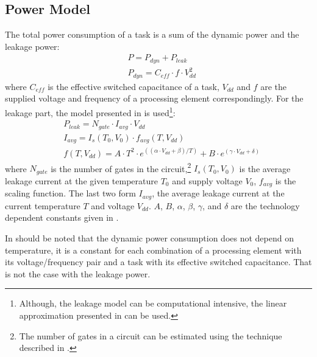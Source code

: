 \subsection{Power Model}
The total power consumption of a task is a sum of the dynamic power and the leakage power:
\begin{align*}
  & P = P_{dyn} + P_{leak} \\
  & P_{dyn} = C_{eff} \cdot f \cdot V_{dd}^2
\end{align*}
where $C_{eff}$ is the effective switched capacitance of a task, $V_{dd}$ and $f$ are the supplied voltage and frequency of a processing element correspondingly. For the leakage part, the model presented in \cite{liao2005} is used\footnote{Although, the leakage model can be computational intensive, the linear approximation presented in \cite{liu2007} can be used.}:
\begin{align*}
  & P_{leak} = N_{gate} \cdot I_{avg} \cdot V_{dd} \\
  & I_{avg} = I_s(T_0, V_0) \cdot f_{avg}(T, V_{dd}) \\
  & f(T, V_{dd}) = A \cdot T^2 \cdot e^{((\alpha \cdot V_{dd} + \beta)/T)} + B \cdot e^{(\gamma \cdot V_{dd} + \delta)}
\end{align*}
where $N_{gate}$ is the number of gates in the circuit,\footnote{The number of gates in a circuit can be estimated using the technique described in \cite{li2004}.} $I_s (T_0, V_0)$ is the average leakage current at the given temperature $T_0$ and supply voltage $V_0$, $f_{avg}$ is the scaling function. The last two form $I_{avg}$, the average leakage current at the current temperature $T$ and voltage $V_{dd}$. $A$, $B$, $\alpha$, $\beta$, $\gamma$, and $\delta$ are the technology dependent constants given in \cite{liao2005}.

In should be noted that the dynamic power consumption does not depend on temperature, it is a constant for each combination of a processing element with its voltage/frequency pair and a task with its effective switched capacitance. That is not the case with the leakage power.

